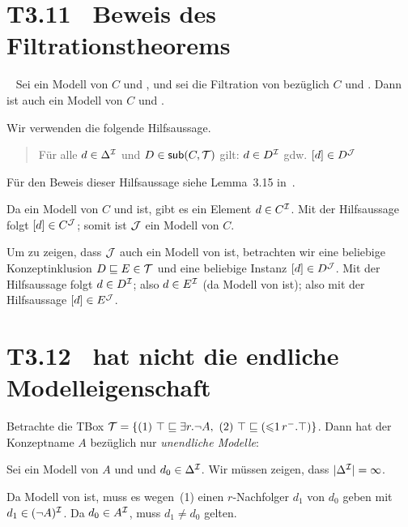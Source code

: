 \documentclass[fontsize=11pt, twoside=false, numbers=autoenddot]{scrbook}
\begin{document}
\section*{T3.11~ Beweis des Filtrationstheorems}

~
Sei \Imc ein Modell von $C$ und \Tmc, und sei \Jmc die Filtration von \Imc bezüglich $C$ und \Tmc.
Dann ist auch \Jmc ein Modell von $C$ und \Tmc.

\par\noindent
\begin{beweis}
  Wir verwenden die folgende Hilfsaussage.
  \begin{quote}
    Für alle $d \in \Delta^\mathcal{I}$ und $D \in \textsf{sub}(C,\mathcal{T})$ gilt:
    \qquad
    $d \in D^\mathcal{I}$
    \quad gdw.\quad
    $[d] \in D^\mathcal{J}$
  \end{quote}
  Für den Beweis dieser Hilfsaussage siehe Lemma~3.15 in~\cite{DLintro}.
  
  \parII
  Da \Imc ein Modell von $C$ und \Tmc ist,
  gibt es ein Element $d \in C^\mathcal{I}$.
  Mit der Hilfsaussage folgt $[d] \in C^\mathcal{J}$; somit ist $\mathcal{J}$ ein Modell von $C$.
  
  Um zu zeigen, dass $\mathcal{J}$ auch ein Modell von \Tmc ist,
  betrachten wir eine beliebige Konzeptinklusion $D \sqsubseteq E \in \mathcal{T}$
  und eine beliebige Instanz $[d] \in D^\mathcal{J}$.
  Mit der Hilfsaussage folgt $d \in D^\mathcal{I}$;
  also $d \in E^\mathcal{I}$ (da \Tmc Modell von \Imc ist);
  also mit der Hilfsaussage $[d] \in E^\mathcal{J}$.
  \qedhere
\end{beweis}

\section*{T3.12~ {\boldmath \ALCQI} hat nicht die endliche Modelleigenschaft}

Betrachte die TBox $\mathcal{T} = \{(1)~ \top \sqsubseteq \exists r.\neg A,~ (2)~\top \sqsubseteq (\mathord{\leqslant}1\,r^-.\top)\}$.
Dann hat der Konzeptname $A$ bezüglich \Tmc nur \emph{unendliche Modelle}:

Sei \Imc ein Modell von $A$ und \Tmc und $d_0 \in \Delta^\mathcal{I}$.
Wir müssen zeigen, dass $|\Delta^\mathcal{I}| = \infty$.


Da \Imc Modell von \Tmc ist, muss es wegen~(1) einen $r$-Nachfolger $d_1$ von $d_0$ geben
mit $d_1 \in (\lnot A)^\mathcal{I}$. Da $d_0 \in A^\mathcal{I}$, muss $d_1 \neq d_0$ gelten.
\end{document}
